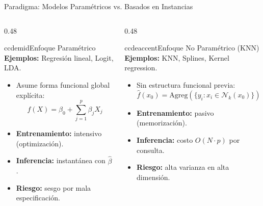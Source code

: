 \begin{frame}{Paradigma: Modelos Paramétricos vs. Basados en Instancias}
\begin{columns}[T,onlytextwidth]
\begin{column}{0.48\textwidth}
\begin{contrastbox}{ccdemid}{Enfoque Paramétrico}
\footnotesize
\textbf{Ejemplos:} Regresión lineal, Logit, LDA.
\begin{itemize}\setlength{\itemsep}{0.12em}
  \item Asume forma funcional global explícita:
  \[ f(X) = \beta_0 + \sum_{j=1}^p \beta_j X_j \]
  \item \textbf{Entrenamiento:} intensivo (optimización).
  \item \textbf{Inferencia:} instantánea con $\hat{\beta}$.
  \item \textbf{Riesgo:} sesgo por mala especificación.
\end{itemize}
\end{contrastbox}
\end{column}

\begin{column}{0.48\textwidth}
\begin{contrastbox}{ccdeaccent}{Enfoque No Paramétrico (KNN)}
\footnotesize
\textbf{Ejemplos:} KNN, Splines, Kernel regression.
\begin{itemize}\setlength{\itemsep}{0.12em}
  \item Sin estructura funcional previa:
  \[ \hat{f}(x_0) = \mathrm{Agreg}(\{y_i : x_i \in \mathcal{N}_k(x_0)\}) \]
  \item \textbf{Entrenamiento:} pasivo (memorización).
  \item \textbf{Inferencia:} costo $O(N \cdot p)$ por consulta.
  \item \textbf{Riesgo:} alta varianza en alta dimensión.
\end{itemize}
\end{contrastbox}
\end{column}
\end{columns}
\end{frame}
